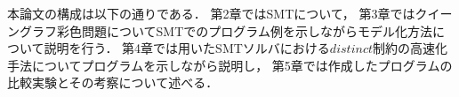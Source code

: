 本論文の構成は以下の通りである．
第2章ではSMTについて，
第3章ではクイーングラフ彩色問題についてSMTでのプログラム例を示しながらモデル化方法について説明を行う．
第4章では用いたSMTソルバにおける$distinct$制約の高速化手法についてプログラムを示しながら説明し，
第5章では作成したプログラムの比較実験とその考察について述べる．


